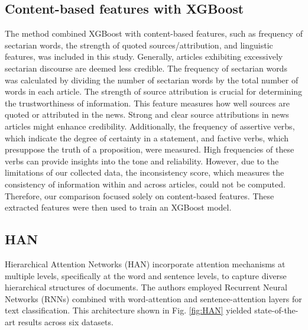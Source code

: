 \subsection{Content-based features with XGBoost}
The method combined XGBoost with content-based features, such as frequency of sectarian words, the strength of quoted sources/attribution, and linguistic features, was included in this study\cite{b19}. Generally, articles exhibiting excessively sectarian discourse are deemed less credible. The frequency of sectarian words was calculated by dividing the number of sectarian words by the total number of words in each article.
The strength of source attribution is crucial for determining the trustworthiness of information. This feature measures how well sources are quoted or attributed in the news. Strong and clear source attributions in news articles might enhance credibility.
Additionally, the frequency of assertive verbs, which indicate the degree of certainty in a statement, and factive verbs, which presuppose the truth of a proposition, were measured. High frequencies of these verbs can provide insights into the tone and reliability.
However, due to the limitations of our collected data, the inconsistency score, which measures the consistency of information within and across articles, could not be computed. Therefore, our comparison focused solely on content-based features. These extracted features were then used to train an XGBoost model.

\subsection{HAN}
Hierarchical Attention Networks (HAN)\cite{b20} incorporate attention mechanisms at multiple levels, specifically at the word and sentence levels, to capture diverse hierarchical structures of documents. The authors employed Recurrent Neural Networks (RNNs) combined with word-attention and sentence-attention layers for text classification. This architecture shown in Fig. \ref{fig:HAN} yielded state-of-the-art results across six datasets.

